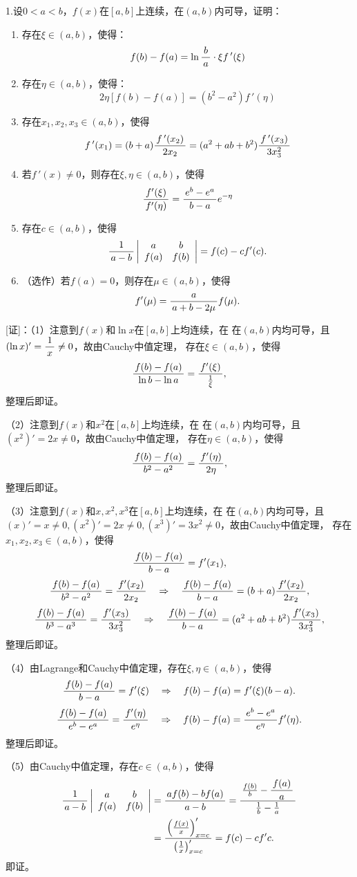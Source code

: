1.设$0<a<b$，$f(x)$在$[a,b]$上连续，在$(a,b)$内可导，证明：
\begin{enumerate}[(1)]
  \setlength{\itemindent}{1cm}
  \item 存在$\xi\in(a,b)$，使得：
	$$f(b)-f(a)=\ln\displaystyle\frac{\,{b}\,}{\,{a}\,}\cdot \xi f\,'(\xi)$$
  \item 存在$\eta\in(a,b)$，使得：
    $$2\eta[f(b)-f(a)]=(b^2-a^2)f\,'(\eta)$$
  \item 存在$x_1,x_2,x_3\in(a,b)$，使得
	$$f\,'(x_1)=(b+a)\displaystyle\frac{\,{f\,'(x_2)}\,}{\,{2x_2}\,}=(a^2+ab+b^2)
	\displaystyle\frac{\,{f\,'(x_3)}\,}{\,{3x_3^2}\,}$$ 
  \item 若$f\,'(x)\ne 0$，则存在$\xi,\eta\in(a,b)$，使得
	$$\displaystyle\frac{\,{f'(\xi)}\,}{\,{f'(\eta)}\,}=\displaystyle\frac{\,{e^b-e^a}\,}{\,{b-a}\,}e^{-\eta}$$
  \item 存在$c\in(a,b)$，使得
	$$\displaystyle\frac{\,{1}\,}{\,{a-b}\,}\left|\begin{array}{cc}
	a & b\\ f(a) & f(b)
	\end{array}\right|=f(c)-cf'(c).$$
  \item （选作）若$f(a)=0$，则存在$\mu\in(a,b)$，使得
  $$f'(\mu)=\displaystyle\frac{\,{a}\,}{\,{a+b-2\mu}\,}f(\mu).$$
\end{enumerate}

[证]：（1）注意到$f(x)$和$\ln x$在$[a,b]$上均连续，在
在$(a,b)$内均可导，且$(\ln x)'=\displaystyle\frac{\,{1}\,}{\,{x}\,}\ne 0$，故由Cauchy中值定理，
存在$\xi\in(a,b)$，使得
$$\displaystyle\frac{\,{f(b)-f(a)}\,}{\,{\ln b-\ln a}\,}=\displaystyle\frac{\,{f'(\xi)}\,}{\,{\frac1{\xi}}\,},$$
整理后即证。

（2）注意到$f(x)$和$x^2$在$[a,b]$上均连续，在
在$(a,b)$内均可导，且$(x^2)'=2x\ne 0$，故由Cauchy中值定理，
存在$\eta\in(a,b)$，使得
$$\displaystyle\frac{\,{f(b)-f(a)}\,}{\,{b^2-a^2}\,}=\displaystyle\frac{\,{f'(\eta)}\,}{\,{2\eta}\,},$$
整理后即证。

（3）注意到$f(x)$和$x,x^2,x^3$在$[a,b]$上均连续，在
在$(a,b)$内均可导，且$(x)'=x\ne 0,(x^2)'=2x\ne 0,
(x^3)'=3x^2\ne 0$，故由Cauchy中值定理，
存在$x_1,x_2,x_3\in(a,b)$，使得
$$\displaystyle\frac{\,{f(b)-f(a)}\,}{\,{b-a}\,}=f'(x_1),$$
$$\displaystyle\frac{\,{f(b)-f(a)}\,}{\,{b^2-a^2}\,}=\displaystyle\frac{\,{f'(x_2)}\,}{\,{2x_2}\,}
\quad\Rightarrow\quad
\displaystyle\frac{\,{f(b)-f(a)}\,}{\,{b-a}\,}=(b+a)\displaystyle\frac{\,{f'(x_2)}\,}{\,{2x_2}\,},$$
$$\displaystyle\frac{\,{f(b)-f(a)}\,}{\,{b^3-a^3}\,}=\displaystyle\frac{\,{f'(x_3)}\,}{\,{3x_3^2}\,}
\quad\Rightarrow\quad
\displaystyle\frac{\,{f(b)-f(a)}\,}{\,{b-a}\,}=(a^2+ab+b^2)\displaystyle\frac{\,{f'(x_3)}\,}{\,{3x_3^2}\,},$$
整理后即证。

（4）由Lagrange和Cauchy中值定理，存在$\xi,\eta\in(a,b)$，使得
$$\displaystyle\frac{\,{f(b)-f(a)}\,}{\,{b-a}\,}=f'(\xi)
\quad\Rightarrow\quad
f(b)-f(a)=f'(\xi)(b-a).$$
$$\displaystyle\frac{\,{f(b)-f(a)}\,}{\,{e^b-e^a}\,}=\displaystyle\frac{\,{f'(\eta)}\,}{\,{e^{\eta}}\,}
\quad\Rightarrow\quad
f(b)-f(a)=\displaystyle\frac{\,{e^b-e^a}\,}{\,{e^{\eta}}\,}f'(\eta).$$
整理后即证。

（5）由Cauchy中值定理，存在$c\in(a,b)$，使得
\begin{align*}
	\displaystyle\frac{\,{1}\,}{\,{a-b}\,}\left|\begin{array}{cc}
	a & b\\ f(a) & f(b)
	\end{array}\right|
	&=\displaystyle\frac{\,{af(b)-bf(a)}\,}{\,{a-b}\,}=\displaystyle\frac{\,{\frac{f(b)}b-\displaystyle\frac{\,{f(a)}\,}{\,{a}\,}}\,}{\,{\frac1b-\frac1a}\,}\\
	&=\displaystyle\frac{\,{\left(\frac{f(x)}x\right)'_{x=c}}\,}{\,{\left(\frac1x\right)'_{x=c}}\,}
	=f(c)-cf'c.
\end{align*}
即证。

